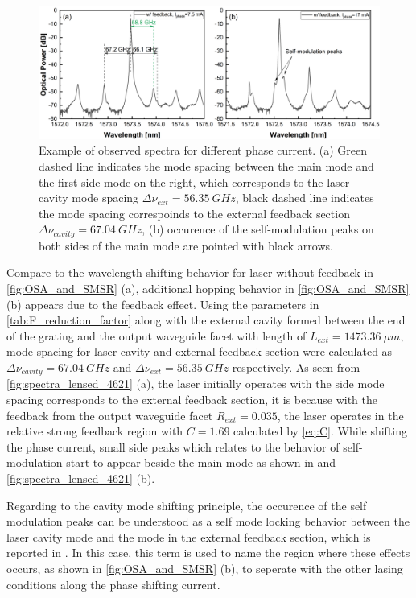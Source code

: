 \begin{figure}[H]
    \centering
    \includegraphics[width=\linewidth]{figures/spectra_lensed_4621.png}
    \caption{Example of observed spectra for different phase current. (a) Green dashed line indicates the mode spacing between the main mode and the first side mode on the right, which corresponds to the laser cavity mode spacing $\Delta\nu_{ext}=56.35 \ GHz$, black dashed line indicates the mode spacing correspoinds to the external feedback section $\Delta\nu_{cavity}=67.04 \ GHz$, (b) occurence of the self-modulation peaks on both sides of the main mode are pointed with black arrows.}
    \label{fig:spectra_lensed_4621}
\end{figure}

Compare to the wavelength shifting behavior for laser without feedback in \autoref{fig:OSA_and_SMSR} (a), additional hopping behavior in \autoref{fig:OSA_and_SMSR} (b) appears due to the feedback effect. Using the parameters in \autoref{tab:F_reduction_factor} along with the external cavity formed between the end of the grating and the output waveguide facet with length of $L_{ext}=1473.36 \ \mu m$, mode spacing for laser cavity and external feedback section were calculated as $\Delta\nu_{cavity}=67.04 \ GHz$ and $\Delta\nu_{ext}=56.35 \ GHz$ respectively. As seen from \autoref{fig:spectra_lensed_4621} (a), the laser initially operates with the side mode spacing corresponds to the external feedback section, it is because with the feedback from the output waveguide facet $R_{ext}=0.035$, the laser operates in the relative strong feedback region with $C=1.69$ calculated by \autoref{eq:C}. While shifting the phase current, small side peaks which relates to the behavior of self-modulation \cite{broom1969self, broom1970microwave} start to appear beside the main mode as shown in and \autoref{fig:spectra_lensed_4621} (b).

Regarding to the cavity mode shifting principle, the occurence of the self modulation peaks can be understood as a self mode locking behavior between the laser cavity mode and the mode in the external feedback section, which is reported in \cite{tager1994high}. In this case, this term is used to name the region where these effects occurs, as shown in \autoref{fig:OSA_and_SMSR} (b), to seperate with the other lasing conditions along the phase shifting current.

